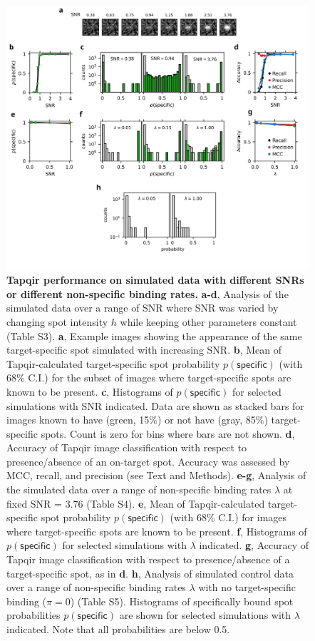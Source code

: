 \begin{figure}[t]
\centering
\includegraphics[width=1\textwidth]{figures/figure5/figure5.png}
\caption{\textbf{Tapqir performance on simulated data with different SNRs or different non-specific binding rates.} \textbf{a-d}, Analysis of the simulated data over a range of SNR where SNR was varied by changing spot intensity  $h$ while keeping other parameters constant (Table S3). \textbf{a}, Example images showing the appearance of the same target-specific spot simulated with increasing SNR.   \textbf{b}, Mean of Tapqir-calculated target-specific spot probability $p(\mathsf{specific})$ (with 68\% C.I.) for the subset of images where target-specific spots  are known to be present. \textbf{c}, Histograms of $p(\mathsf{specific})$ for selected simulations with SNR indicated. Data are shown as stacked bars for images known to have (green, 15\%) or not have (gray, 85\%) target-specific spots.  Count is zero for bins where bars are not shown. \textbf{d}, Accuracy of Tapqir image classification with respect to presence/absence of an on-target spot. Accuracy was assessed by MCC, recall, and precision (see Text and Methods). \textbf{e-g}, Analysis of the simulated data over a range of non-specific binding rates $\lambda$ at fixed SNR = 3.76 (Table S4).  \textbf{e}, Mean of Tapqir-calculated target-specific spot probability $p(\mathsf{specific})$ (with 68\% C.I.) for images where target-specific spots  are known to be present. \textbf{f}, Histograms of $p(\mathsf{specific})$ for selected simulations with $\lambda$ indicated. \textbf{g}, Accuracy of Tapqir image classification with respect to presence/absence of a target-specific spot, as in \textbf{d}. \textbf{h}, Analysis of simulated control data over a range of non-specific binding rates $\lambda$ with no target-specific binding ($\pi = 0$) (Table S5). Histograms of specifically bound spot probabilities $p(\mathsf{specific})$ are shown for selected simulations with $\lambda$ indicated. Note that all probabilities are below 0.5.}
\label{fig:tapqir_performance}
\end{figure}

